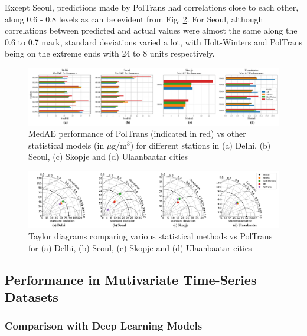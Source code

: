 \documentclass[10pt,journal]{IEEEtran}
\begin{document}
Except Seoul, predictions made by {PolTrans} had correlations close to each other, along 0.6 - 0.8 levels as can be evident from Fig. \ref{fig:stat-taylor}. For Seoul, although correlations between predicted and actual values were almost the same along the 0.6 to 0.7 mark, standard deviations varied a lot, with Holt-Winters and {PolTrans} being on the extreme ends with 24 to 8 units respectively.

\begin{figure}[h]
\centering
\includegraphics[scale=0.365]{../paper_figures/stat_medae.png}
\caption{MedAE performance of {PolTrans} (indicated in red) vs other statistical models (in $\mu$g/m$^{3}$) for different stations in (a) Delhi, (b) Seoul, (c) Skopje and (d) Ulaanbaatar cities}
\label{fig:stat-medae}
\end{figure}

\begin{figure}[h]
\centering
\includegraphics[width=18cm]{../paper_figures/merged_taylor_stat.png}
\caption{Taylor diagrams comparing various statistical methods vs {PolTrans} for (a) Delhi, (b) Seoul, (c) Skopje and (d) Ulaanbaatar cities}
\label{fig:stat-taylor}
\end{figure}

\subsection{Performance in Mutivariate Time-Series Datasets}

\subsubsection{Comparison with Deep Learning Models}
\end{document}
